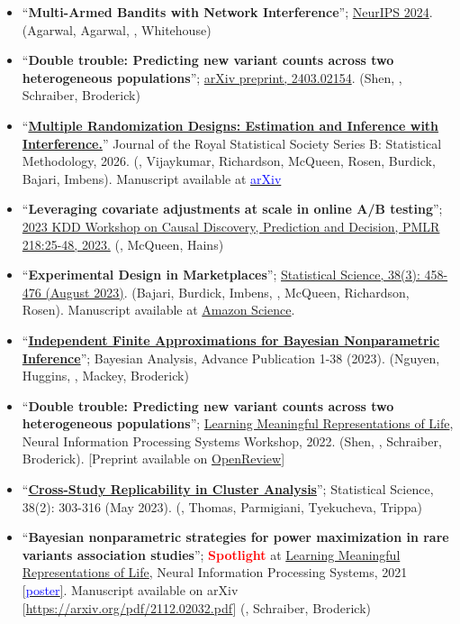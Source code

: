 \documentclass[10pt, a4paper]{article}
\begin{document}
\begin{itemize}
	\item ``\textbf{Multi-Armed Bandits with Network Interference}''; \href{https://arxiv.org/abs/2405.18621}{NeurIPS 2024}. (Agarwal, Agarwal, \mm, Whitehouse)
	\item ``\textbf{Double trouble: Predicting new variant counts across two heterogeneous populations}''; \href{https://arxiv.org/pdf/2403.02154.pdf}{arXiv preprint, 2403.02154}. (Shen, \mm, Schraiber, Broderick)
	\item ``\href{https://doi.org/10.1093/jrsssb/qkaf073}{\textbf{Multiple Randomization Designs: Estimation and Inference with Interference.}}'' Journal of the Royal Statistical Society Series B: Statistical Methodology, 2026. (\mm, Vijaykumar, Richardson, McQueen, Rosen, Burdick, Bajari, Imbens). Manuscript available at \href{https://arxiv.org/abs/2112.13495}{\textcolor{blue}{arXiv}}
	\item ``\textbf{Leveraging covariate adjustments at scale in online A/B testing}''; \href{https://proceedings.mlr.press/v218/masoero23a.html}{2023 KDD Workshop on Causal Discovery, Prediction and Decision, PMLR 218:25-48, 2023.} (\mm, McQueen, Hains)
	\item ``\textbf{Experimental Design in Marketplaces}''; \href{https://projecteuclid.org/journals/statistical-science/advance-publication/Experimental-Design-in-Marketplaces/10.1214/23-STS883.short}{Statistical Science, 38(3): 458-476 (August 2023)}. (Bajari, Burdick, Imbens, \mm, McQueen, Richardson, Rosen). Manuscript available at \href{https://www.amazon.science/publications/experimental-design-in-marketplaces}{Amazon Science}.
	\item ``\href{https://arxiv.org/abs/2009.10780}{\textbf{Independent Finite Approximations for Bayesian Nonparametric Inference}}''; Bayesian Analysis, Advance Publication 1-38 (2023). (Nguyen, Huggins, \mm, Mackey, Broderick)
	\item ``\textbf{Double trouble: Predicting new variant counts across two heterogeneous populations}''; \href{https://www.lmrl.org/}{Learning Meaningful Representations of Life},  Neural Information Processing Systems Workshop, 2022. (Shen, \mm, Schraiber, Broderick). [Preprint available on \href{https://openreview.net/pdf?id=euBgC9yLeyl}{OpenReview}]
	\item ``\href{https://arxiv.org/abs/2202.01910}{\textbf{Cross-Study Replicability in Cluster Analysis}}''; Statistical Science, 38(2): 303-316 (May 2023). (\mm, Thomas, Parmigiani, Tyekucheva, Trippa)
	\item ``\textbf{Bayesian nonparametric strategies for power maximization in rare variants association studies}''; \textcolor{red}{\textbf{Spotlight}} at \href{https://www.lmrl.org/}{Learning Meaningful Representations of Life},  Neural Information Processing Systems, 2021 [\href{https://lorenzomasoero.com/files/LRML_21_poster.pdf}{\textcolor{blue}{poster}]}. Manuscript available on arXiv [\url{https://arxiv.org/pdf/2112.02032.pdf}] (\mm, Schraiber, Broderick)

\end{itemize}
\end{document}
